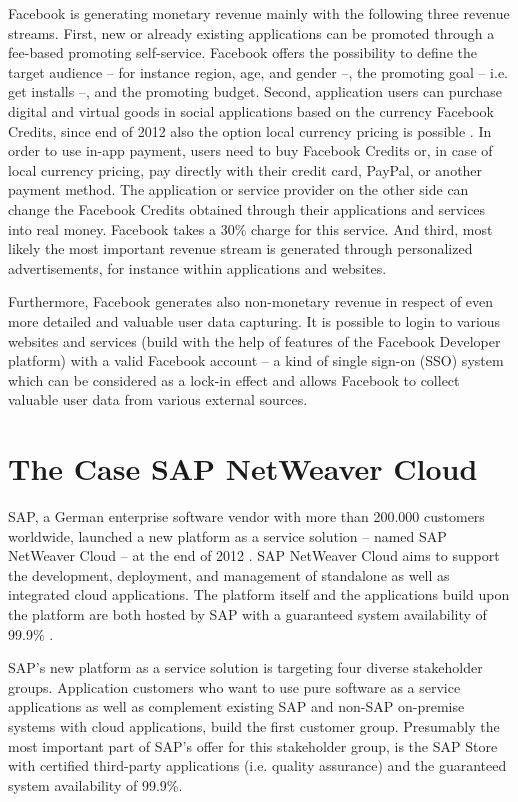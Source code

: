 Facebook is generating monetary revenue mainly with the following three revenue streams. First, new or already existing applications can be promoted through a fee-based promoting self-service. Facebook offers the possibility to define the target audience -- for instance region, age, and gender --, the promoting goal -- i.e. get installs --, and the promoting budget. Second, application users can purchase digital and virtual goods in social applications based on the currency Facebook Credits, since end of 2012 also the option local currency pricing is possible \citep{Facebook2013a}. In order to use in-app payment, users need to buy Facebook Credits or, in case of local currency pricing, pay directly with their credit card, PayPal, or another payment method. The application or service provider on the other side can change the Facebook Credits obtained through their applications and services into real money. Facebook takes a 30\% charge for this service. And third, most likely the most important revenue stream is generated through personalized advertisements, for instance within applications and websites.

Furthermore, Facebook generates also non-monetary revenue in respect of even more detailed and valuable user data capturing. It is possible to login to various websites and services (build with the help of features of the Facebook Developer platform) with a valid Facebook account -- a kind of single sign-on (SSO) system which can be considered as a lock-in effect and allows Facebook to collect valuable user data from various external sources.


\section{The Case SAP NetWeaver Cloud}

SAP, a German enterprise software vendor with more than 200.000 customers worldwide, launched a new platform as a service solution -- named SAP NetWeaver Cloud -- at the end of 2012 \citep{SAP2013a, SAP2013b}. SAP NetWeaver Cloud aims to support the development, deployment, and management of standalone as well as integrated cloud applications. The platform itself and the applications build upon the platform are both hosted by SAP with a guaranteed system availability of 99.9\% \citep{SAP2013b}.

SAP's new platform as a service solution is targeting four diverse stakeholder groups. Application customers who want to use pure software as a service applications as well as complement existing SAP and non-SAP on-premise systems with cloud applications, build the first customer group. Presumably the most important part of SAP's offer for this stakeholder group, is the SAP Store with certified third-party applications (i.e. quality assurance) and the guaranteed system availability of 99.9\%.

